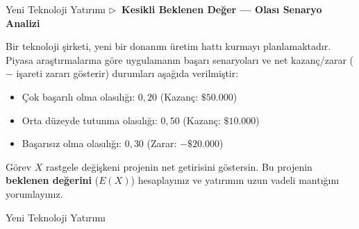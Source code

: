 ﻿\documentclass[light]{lutbeamer}
\begin{document}
\begin{frame}{Yeni Teknoloji Yatırımı}
  \textbf{\small $\triangleright$~Kesikli Beklenen Değer --- Olası Senaryo Analizi}

  \smallskip
  \small
  Bir teknoloji şirketi, yeni bir donanım üretim hattı kurmayı planlamaktadır. Piyasa araştırmalarına göre uygulamanın başarı senaryoları ve net kazanç/zarar ($-$ işareti zararı gösterir) durumları aşağıda verilmiştir:
  \begin{itemize}
    \item Çok başarılı olma olasılığı: $0{,}20$ (Kazanç: $\$50.000$)
    \item Orta düzeyde tutunma olasılığı: $0{,}50$ (Kazanç: $\$10.000$)
    \item Başarısız olma olasılığı: $0{,}30$ (Zarar: $-\$20.000$)
  \end{itemize}

  \medskip
  \begin{block}{Görev}
    $X$ rastgele değişkeni projenin net getirisini göstersin. Bu projenin \textbf{beklenen değerini} ($E(X)$) hesaplayınız ve yatırımın uzun vadeli mantığını yorumlayınız.
  \end{block}
\end{frame}

\begin{frame}{Yeni Teknoloji Yatırımı}
\end{frame}
\end{document}
